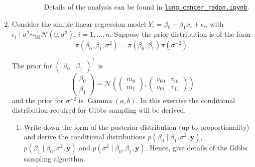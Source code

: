 \documentclass[letterpaper,11pt]{article}
\begin{document}
\begin{enumerate}
\begin{enumerate}
\begin{description}
      Details of the analysis can be found in
      \href{https://nbviewer.jupyter.org/github/ppham27/stat570/blob/master/hw5/lung\_cancer\_radon.ipynb}{\texttt{lung\_cancer\_radon.ipynb}}.
    \end{description}
  \end{enumerate}
\item Consider the simple linear regression model
  $Y_i = \beta_0 + \beta_1x_i + \epsilon_i$, with
  $\epsilon_i \mid \sigma^2 \sim_\mathrm{iid} \mathcal{N}\left(0,
    \sigma^2\right)$, $i = 1,\ldots, n$. Suppose the prior distribution is of the
  form
  \begin{equation}
    \pi\left(\beta_0,\beta_1,\sigma^2\right) = \pi\left(\beta_0,\beta_1\right)
    \pi\left(\sigma^{-2}\right).
  \end{equation}

  The prior for $\begin{pmatrix}\beta_0 & \beta_1\end{pmatrix}^\intercal$ is
  \begin{equation}
    \begin{pmatrix}
      \beta_0 \\ \beta_1
    \end{pmatrix} \sim
    \mathcal{N}\left(
      \begin{pmatrix}
        m_0 \\ m_1
      \end{pmatrix},
      \begin{pmatrix}
        v_{00} & v_{01} \\ v_{01} & v_{11}
      \end{pmatrix} 
    \right)
  \end{equation}
  and the prior for $\sigma^{-2}$ is $\operatorname{Gamma}\left(a, b\right)$. In
  this exercise the conditional distribution required for Gibbs sampling will be
  derived.

  \begin{enumerate}
  \item Write down the form of the posterior distribution (up to
    proportionality) and derive the conditional distributions
    $p\left(\beta_0 \mid \beta_1, \sigma^2, \mathbf{y}\right)$,
    $p\left(\beta_1 \mid \beta_0, \sigma^2, \mathbf{y}\right)$ and
    $p\left(\sigma^2 \mid \beta_0, \beta_1, \mathbf{y}\right)$. Hence, give details of the
    Gibbs sampling algorithm.


\end{enumerate}
\end{enumerate}
\end{document}
